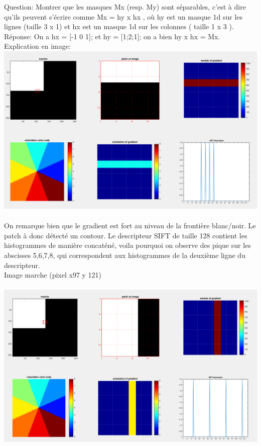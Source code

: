 \documentclass[a4paper]{article}
\begin{document}
Question: Montrer que les masques Mx (resp. My) sont séparables, c'est à dire qu'ils peuvent s’écrire comme Mx = hy x hx , où hy est un masque 1d sur les lignes (taille 3 x 1) et hx est un masque 1d sur les colonnes ( taille 1 x 3 ).\\

Réponse: On a hx = [-1 0 1]; et hy = [1;2;1]; on a bien hy x hx = Mx.\\

Explication en image:\\
\includegraphics[width=\textwidth]{Sift_patch_marche}\\\\
On remarque bien que le gradient est fort au niveau de la frontière blanc/noir. Le patch à donc détecté un contour. Le descripteur SIFT de taille 128 contient les histogrammes de manière concaténé, voila pourquoi on observe des pique sur les abscisses 5,6,7,8, qui correspondent aux histogrammes de la deuxième ligne du descripteur.\\

Image marche (pixel x97 y 121)\\\\
\includegraphics[width=\textwidth]{marche_97_121}\\
\end{document}
